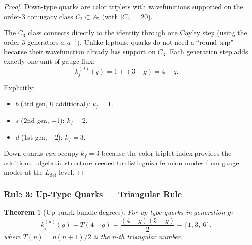 \documentclass[11pt,a4paper]{article}
\newtheorem{theorem}{Theorem}
\theoremstyle{definition}
\theoremstyle{remark}
\begin{document}
\begin{proof}
Down-type quarks are color triplets with wavefunctions supported on the
order-3 conjugacy class $C_3 \subset A_5$ (with $|C_3| = 20$).

The $C_3$ class connects directly to the identity through one Cayley step
(using the order-3 generators $a, a^{-1}$).  Unlike leptons, quarks
do not need a ``round trip'' because their wavefunction already has
support on $C_3$.  Each generation step adds exactly one unit of gauge flux:
\[
k_f^{(d)}(g) = 1 + (3 - g) = 4 - g.
\]

Explicitly:
\begin{itemize}
\item $b$ (3rd gen, 0 additional): $k_f = 1$.
\item $s$ (2nd gen, +1): $k_f = 2$.
\item $d$ (1st gen, +2): $k_f = 3$.
\end{itemize}

Down quarks \emph{can} occupy $k_f = 3$ because the color triplet index
provides the additional algebraic structure needed to distinguish
fermion modes from gauge modes at the $L_{\det}$ level.
\end{proof}

\subsubsection{Rule 3: Up-Type Quarks --- Triangular Rule}

\begin{theorem}[Up-quark bundle degrees]
\label{thm:up}
For up-type quarks in generation $g$:
\begin{equation}
\boxed{k_f^{(u)}(g) = T(4-g) = \frac{(4-g)(5-g)}{2} = \{1,\, 3,\, 6\},}
\end{equation}
where $T(n) = n(n+1)/2$ is the $n$-th triangular number.
\end{theorem}
\end{document}
